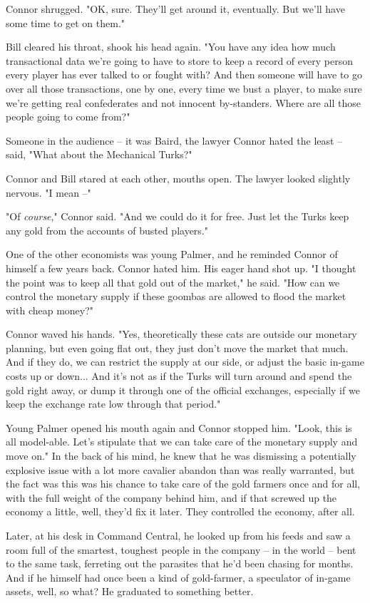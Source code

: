 Connor shrugged. "OK, sure. They'll get around it, eventually. But
we'll have some time to get on them."

Bill cleared his throat, shook his head again. "You have any idea
how much transactional data we're going to have to store to keep a
record of every person every player has ever talked to or fought
with? And then someone will have to go over all those transactions,
one by one, every time we bust a player, to make sure we're getting
real confederates and not innocent by-standers. Where are all those
people going to come from?"

Someone in the audience -- it was Baird, the lawyer Connor hated
the least -- said, "What about the Mechanical Turks?"

Connor and Bill stared at each other, mouths open. The lawyer
looked slightly nervous. "I mean --"

"Of \emph{course}," Connor said. "And we could do it for free. Just
let the Turks keep any gold from the accounts of busted players."

One of the other economists was young Palmer, and he reminded
Connor of himself a few years back. Connor hated him. His eager
hand shot up. "I thought the point was to keep all that gold out of
the market," he said. "How can we control the monetary supply if
these goombas are allowed to flood the market with cheap money?"

Connor waved his hands. "Yes, theoretically these cats are outside
our monetary planning, but even going flat out, they just don't
move the market that much. And if they do, we can restrict the
supply at our side, or adjust the basic in-game costs up or down...
And it's not as if the Turks will turn around and spend the gold
right away, or dump it through one of the official exchanges,
especially if we keep the exchange rate low through that period."

Young Palmer opened his mouth again and Connor stopped him. "Look,
this is all model-able. Let's stipulate that we can take care of
the monetary supply and move on." In the back of his mind, he knew
that he was dismissing a potentially explosive issue with a lot
more cavalier abandon than was really warranted, but the fact was
this was his chance to take care of the gold farmers once and for
all, with the full weight of the company behind him, and if that
screwed up the economy a little, well, they'd fix it later. They
controlled the economy, after all.

Later, at his desk in Command Central, he looked up from his feeds
and saw a room full of the smartest, toughest people in the company
-- in the world -- bent to the same task, ferreting out the
parasites that he'd been chasing for months. And if he himself had
once been a kind of gold-farmer, a speculator of in-game assets,
well, so what? He graduated to something better.

